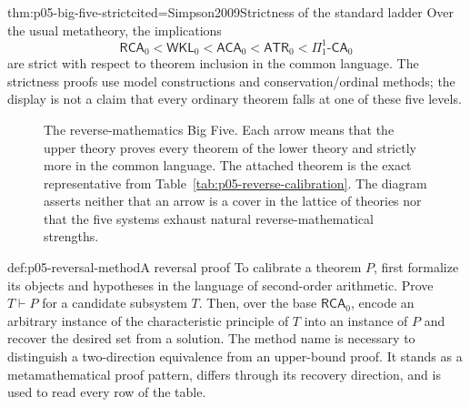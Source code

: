 \begin{hbtheorem}{thm:p05-big-five-strict}{cited=Simpson2009}{Strictness of the standard ladder}
Over the usual metatheory, the implications
\[
 \mathsf{RCA}_0
 <\mathsf{WKL}_0
 <\mathsf{ACA}_0
 <\mathsf{ATR}_0
 <\Pi^1_1\text{-}\mathsf{CA}_0
\]
are strict with respect to theorem inclusion in the common language. The
strictness proofs use model constructions and conservation/ordinal methods;
the display is not a claim that every ordinary theorem falls at one of these
five levels.
\end{hbtheorem}

\begin{figure}[htbp]
\centering
{}
\caption{The reverse-mathematics Big Five.  Each arrow means
that the upper theory proves every theorem of the lower theory and strictly
more in the common language.  The attached theorem is the exact representative
from Table~\ref{tab:p05-reverse-calibration}.  The diagram asserts neither that
an arrow is a cover in the lattice of theories nor that the five systems
exhaust natural reverse-mathematical strengths.}
\label{fig:p05-big-five}
\end{figure}

\begin{hbmethod}{def:p05-reversal-method}{A reversal proof}
To calibrate a theorem \(P\), first formalize its objects and hypotheses in the
language of second-order arithmetic. Prove \(T\vdash P\) for a candidate
subsystem \(T\). Then, over the base \(\mathsf{RCA}_0\), encode an arbitrary
instance of the characteristic principle of \(T\) into an instance of \(P\)
and recover the desired set from a solution. The method name is necessary to
distinguish a two-direction equivalence from an upper-bound proof. It stands as
a metamathematical proof pattern, differs through its recovery direction, and
is used to read every row of the table.
\end{hbmethod}


